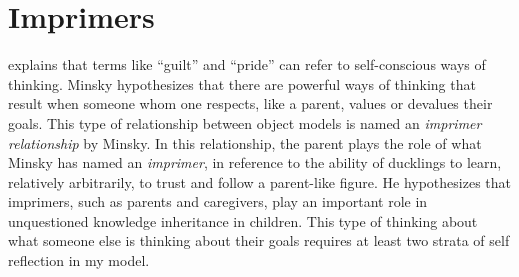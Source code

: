 \section{Imprimers}

\cite{minsky:2006} explains that terms like ``guilt'' and ``pride''
can refer to self-conscious ways of thinking.  Minsky hypothesizes
that there are powerful ways of thinking that result when someone whom
one respects, like a parent, values or devalues their goals.  This
type of relationship between object models is named an \emph{imprimer
  relationship} by Minsky.  In this relationship, the parent plays the
role of what Minsky has named an \emph{imprimer}, in reference to the
ability of ducklings to learn, relatively arbitrarily, to trust and
follow a parent-like figure.  He hypothesizes that imprimers, such as
parents and caregivers, play an important role in unquestioned
knowledge inheritance in children.  This type of thinking about what
someone else is thinking about their goals requires at least two
strata of self reflection in my model.

